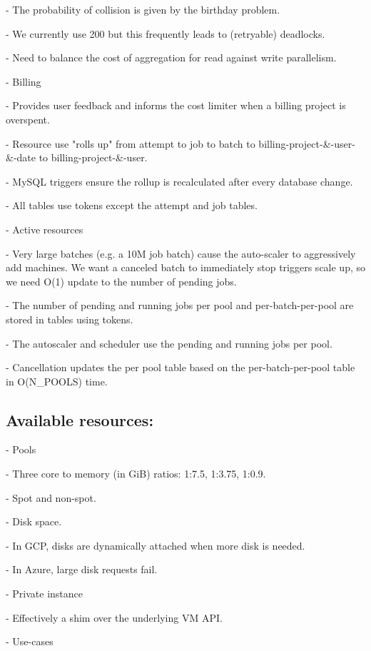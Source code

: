 \documentclass[sigconf, nonacm]{acmart}
\begin{document}
      - The probability of collision is given by the birthday problem.

      - We currently use 200 but this frequently leads to (retryable) deadlocks.

      - Need to balance the cost of aggregation for read against write parallelism.

    - Billing

      - Provides user feedback and informs the cost limiter when a billing project is overspent.

      - Resource use "rolls up" from attempt to job to batch to billing-project-\&-user-\&-date to billing-project-\&-user.

      - MySQL triggers ensure the rollup is recalculated after every database change.

      - All tables use tokens except the attempt and job tables.

    - Active resources

      - Very large batches (e.g. a 10M job batch) cause the auto-scaler to aggressively add machines. We want a canceled batch to immediately stop triggers scale up, so we need O(1) update to the number of pending jobs.

      - The number of pending and running jobs per pool and per-batch-per-pool are stored in tables using tokens.

      - The autoscaler and scheduler use the pending and running jobs per pool.

      - Cancellation updates the per pool table based on the per-batch-per-pool table in O(N\_POOLS) time.

\subsection{Available resources:}

    - Pools

      - Three core to memory (in GiB) ratios: 1:7.5, 1:3.75, 1:0.9.

      - Spot and non-spot.

      - Disk space.

        - In GCP, disks are dynamically attached when more disk is needed.

        - In Azure, large disk requests fail.

    - Private instance

      - Effectively a shim over the underlying VM API.

      - Use-cases
\end{document}
